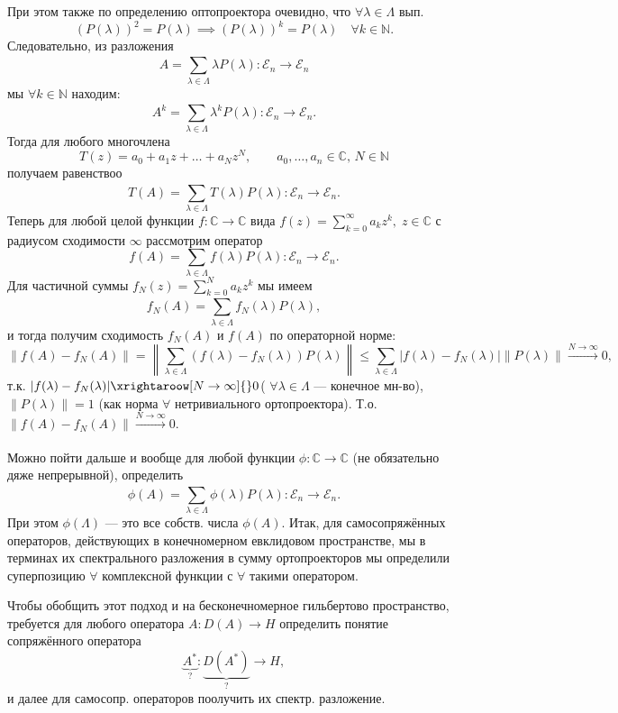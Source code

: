 При этом также по определению оптопроектора очевидно, что
$\forall \lambda \in \Lambda$ вып.
\[
	(P(\lambda))^2=P(\lambda)\implies
	(P(\lambda))^k =P(\lambda) \quad \forall k \in \mathbb{N}
.\] 
Следовательно, из разложения
\[
	A= \sum_{\lambda \in \Lambda}^{} \lambda P(\lambda):
	\mathcal{E}_n \to  \mathcal{E}_n
\]
мы $\forall k \in \mathbb{N}$ находим:
\[
	A^k= \sum_{\lambda \in \Lambda}^{} \lambda^k P(\lambda):
	\mathcal{E}_n \to \mathcal{E}_n
.\] 
Тогда для любого многочлена
\[
	T(z)= a_0 +a_1 z + \ldots+ a_N z^N,\qquad 
	a_0, \ldots, a_n \in \mathbb{C},\, N \in \mathbb{N}
\]
получаем равенствоо
\[
	T(A) = \sum_{\lambda \in \Lambda}^{} T(\lambda)
	P(\lambda): \mathcal{E}_n \to \mathcal{E}_n
.\] 
Теперь для любой целой функции $f : \mathbb{C}\to \mathbb{C}$ 
вида $f(z) = \sum_{k=0}^{\infty} a_k z^k, \; z \in \mathbb{C}$ с
радиусом сходимости $\infty$ рассмотрим оператор
\[
	f(A)= \sum_{\lambda \in \Lambda} f(\lambda)P(\lambda):
	\mathcal{E}_n\to \mathcal{E}_n
.\] 
Для частичной суммы
$f_N(z)=\sum_{k=0}^{N} a_k z^k$ мы имеем
 \[
	 f_N (A)=\sum_{\lambda \in \Lambda}^{} f_N (\lambda)
	 P(\lambda), 
\]
и тогда получим сходимость
$f_N(A)$ и $f(A)$ по операторной норме:
\[
	\| f(A) -f_N (A)\|= \left\lVert \sum_{\lambda \in \Lambda
	}^{} \left( f(\lambda) - f_N (\lambda) \right) P(\lambda)\right\rVert\le  \sum_{\lambda \in \Lambda}^{}|f(\lambda)-
f_N(\lambda)| \| P(\lambda)\|\xrightarrow[]{N\to \infty}0
,\] 
т.\:к. $|f(\lambda)-f_N(\lambda)|\xrightaroow[N\to \infty]{}0 $(
$\forall \lambda \in \Lambda$ --- конечное мн-во),
$\|P(\lambda)\|=1$ (как норма  $\forall$ нетривиального
ортопроектора).
Т.\:о. $\| f(A)-f_N(A)\|\xrightarrow[]{N\to  \infty}0$.

Можно пойти дальше и вообще для любой функции $\phi: \mathbb{C}\to 
\mathbb{C}$ (не обязательно дяже непрерывной), определить
\[
	\phi(A)= \sum_{\lambda \in \Lambda}^{} \phi(\lambda)
	P(\lambda) :
	\mathcal{E}_n \to  \mathcal{E}_n
.\] 
При этом $\phi(\Lambda)$ --- это все собств. числа $\phi(A)$.
Итак, для самосопряжённых операторов, действующих в конечномерном
евклидовом пространстве, мы в терминах
их спектрального разложения в сумму ортопроекторов мы определили
суперпозицию $\forall$ комплексной функции с $\forall$ такими
оператором.

Чтобы обобщить этот подход и на бесконечномерное гильбертово пространство,
требуется для любого оператора $A: D(A)\to H$ определить понятие
сопряжённого оператора \[\underbrace{A^*}_{?}: \underbrace{D(A^*)}_{?} \to  H,\]
и далее для самосопр. операторов поолучить их спектр. разложение.

